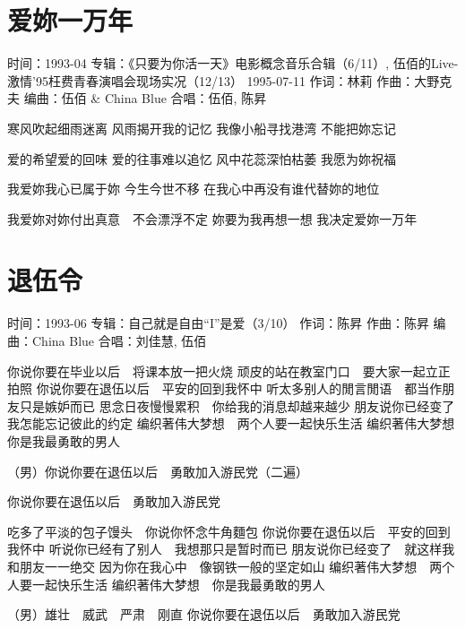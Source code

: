 \documentclass[UTF8,a4paper,oneside,twocolumn,12pt]{ctexbook}
\newcommand{\infopair}[2]{\textbullet #1：#2}
\newcommand{\zc}[1][伍佰]{\infopair{作词}{#1}}
\newcommand{\zq}[1][伍佰]{\infopair{作曲}{#1}}
\newcommand{\bq}[1][伍佰]{\infopair{编曲}{#1}}
\newcommand{\zj}[1]{\infopair{专辑}{#1}}
\newcommand{\sj}[1]{\infopair{时间}{#1}}
\newenvironment{info}{\begin{flushleft}\kaishu
	}
	{\end{flushleft}\normalsize\yahei\par}
\newenvironment{lyric}{
	}
{}
\begin{document}
\section{爱妳一万年}
\begin{info}
	\sj{1993-04}
	\zj{《只要为你活一天》电影概念音乐合辑（6/11）, 伍佰的Live-激情'95枉费青春演唱会现场实况（12/13） 1995-07-11}
	\zc[林莉]
	\zq[大野克夫]
	\bq[伍佰 \& China Blue]
	\infopair{合唱}{伍佰, 陈昇}
\end{info}
\begin{lyric}%
	寒风吹起细雨迷离 风雨揭开我的记忆
	我像小船寻找港湾 不能把妳忘记

	爱的希望爱的回味 爱的往事难以追忆
	风中花蕊深怕枯萎 我愿为妳祝福

	我爱妳我心已属于妳 今生今世不移
	在我心中再没有谁代替妳的地位

	我爱妳对妳付出真意　不会漂浮不定
	妳要为我再想一想 我决定爱妳一万年
\end{lyric}

\section{退伍令}%
\begin{info}
	\sj{1993-06}%
	\zj{自己就是自由``I''是爱（3/10）}
	\zc[陈昇]
	\zq[陈昇]
	\bq[China Blue]
	\infopair{合唱}{刘佳慧, 伍佰}
\end{info}
\begin{lyric}%
	你说你要在毕业以后　将课本放一把火烧
	顽皮的站在教室门口　要大家一起立正拍照
	你说你要在退伍以后　平安的回到我怀中
	听太多别人的閒言閒语　都当作朋友只是嫉妒而已
	思念日夜慢慢累积　你给我的消息却越来越少
	朋友说你已经变了　我怎能忘记彼此的约定
	编织著伟大梦想　两个人要一起快乐生活
	编织著伟大梦想　你是我最勇敢的男人

	（男）你说你要在退伍以后　勇敢加入游民党（二遍）

	你说你要在退伍以后　勇敢加入游民党

	吃多了平淡的包子馒头　你说你怀念牛角麵包
	你说你要在退伍以后　平安的回到我怀中
	听说你已经有了别人　我想那只是暂时而已
	朋友说你已经变了　就这样我和朋友一一绝交
	因为你在我心中　像钢铁一般的坚定如山
	编织著伟大梦想　两个人要一起快乐生活
	编织著伟大梦想　你是我最勇敢的男人

	（男）雄壮　威武　严肃　刚直
	你说你要在退伍以后　勇敢加入游民党
\end{lyric}
\end{document}
